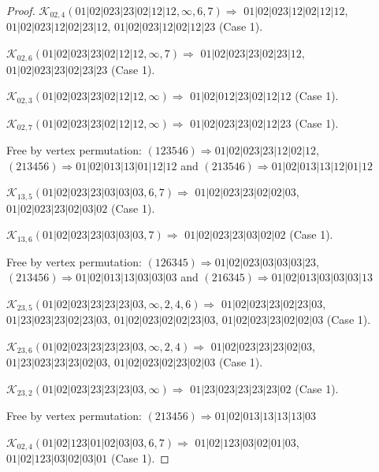 \documentclass[12pt]{article}
\theoremstyle{plain}
\theoremstyle{definition}
\theoremstyle{remark}
\newcommand{\fancy}[1]{\mathcal{#1}}
\def\K{\fancy{K}}
\begin{document}
\begin{proof}
	
	
	\bigskip
	
	$\K_{02,4}(01|02|023|23|02|12|12,\infty,6, 7)\Rightarrow $ $01|02|023|12|02|12|12$, $01|02|023|12|02|23|12$, $01|02|023|12|02|12|23$ (Case 1).
	
	$\K_{02,6}(01|02|023|23|02|12|12,\infty,7)\Rightarrow $ $01|02|023|23|02|23|12$, $01|02|023|23|02|23|23$ (Case 1).
	
	$\K_{02,3}(01|02|023|23|02|12|12,\infty)\Rightarrow $ $01|02|012|23|02|12|12$ (Case 1).
	
	$\K_{02,7}(01|02|023|23|02|12|12,\infty)\Rightarrow $ $01|02|023|23|02|12|23$ (Case 1).
	
	
	
	Free by vertex permutation: $(1 2 3 5 4 6)\Rightarrow 01|02|023|23|12|02|12$, $(2 1 3 4 5 6)\Rightarrow 01|02|013|13|01|12|12$ and $(2 1 3 5 4 6)\Rightarrow 01|02|013|13|12|01|12$
	
	
	
	\bigskip
	
	$\K_{13,5}(01|02|023|23|03|03|03,6, 7)\Rightarrow $ $01|02|023|23|02|02|03$, $01|02|023|23|02|03|02$ (Case 1).
	
	$\K_{13,6}(01|02|023|23|03|03|03,7)\Rightarrow $ $01|02|023|23|03|02|02$ (Case 1).
	
	
	
	Free by vertex permutation: $(1 2 6 3 4 5)\Rightarrow 01|02|023|03|03|03|23$, $(2 1 3 4 5 6)\Rightarrow 01|02|013|13|03|03|03$ and $(2 1 6 3 4 5)\Rightarrow 01|02|013|03|03|03|13$
	
	
	
	\bigskip
	
	$\K_{23,5}(01|02|023|23|23|23|03,\infty,2, 4, 6)\Rightarrow $ $01|02|023|23|02|23|03$, $01|23|023|23|02|23|03$, $01|02|023|02|02|23|03$, $01|02|023|23|02|02|03$ (Case 1).
	
	$\K_{23,6}(01|02|023|23|23|23|03,\infty,2, 4)\Rightarrow $ $01|02|023|23|23|02|03$, $01|23|023|23|23|02|03$, $01|02|023|02|23|02|03$ (Case 1).
	
	$\K_{23,2}(01|02|023|23|23|23|03,\infty)\Rightarrow $ $01|23|023|23|23|23|02$ (Case 1).
	
	
	
	Free by vertex permutation: $(2 1 3 4 5 6)\Rightarrow 01|02|013|13|13|13|03$
	
	
	
	\bigskip
	
	$\K_{02,4}(01|02|123|01|02|03|03,6, 7)\Rightarrow $ $01|02|123|03|02|01|03$, $01|02|123|03|02|03|01$ (Case 1).
	

\end{proof}
\end{document}
